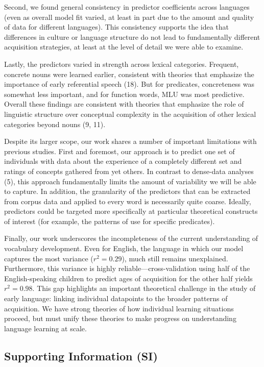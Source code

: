 \documentclass[9pt,twocolumn,twoside]{pnas-new}
\begin{document}
Second, we found general consistency in predictor coefficients across
languages (even as overall model fit varied, at least in part due to the
amount and quality of data for different languages). This consistency
supports the idea that differences in culture or language structure do
not lead to fundamentally different acquisition strategies, at least at
the level of detail we were able to examine.

Lastly, the predictors varied in strength across lexical categories.
Frequent, concrete nouns were learned earlier, consistent with theories
that emphasize the importance of early referential speech (18). But for
predicates, concreteness was somewhat less important, and for function
words, MLU was most predictive. Overall these findings are consistent
with theories that emphasize the role of linguistic structure over
conceptual complexity in the acquisition of other lexical categories
beyond nouns (9, 11).

Despite its larger scope, our work shares a number of important
limitations with previous studies. First and foremost, our approach is
to predict one set of individuals with data about the experience of a
completely different set and ratings of concepts gathered from yet
others. In contrast to dense-data analyses (5), this approach
fundamentally limits the amount of variability we will be able to
capture. In addition, the granularity of the predictors that can be
extracted from corpus data and applied to every word is necessarily
quite coarse. Ideally, predictors could be targeted more specifically at
particular theoretical constructs of interest (for example, the patterns
of use for specific predicates).

Finally, our work underscores the incompleteness of the current
understanding of vocabulary development. Even for English, the language
in which our model captures the most variance (\(r^2 = 0.29\)), much
still remains unexplained. Furthermore, this variance is highly
reliable---cross-validation using half of the English-speaking children
to predict ages of acquisition for the other half yields \(r^2 = 0.98\).
This gap highlights an important theoretical challenge in the study of
early language: linking individual datapoints to the broader patterns of
acquisition. We have strong theories of how individual learning
situations proceed, but must unify these theories to make progress on
understanding language learning at scale.

\subsection*{Supporting Information
(SI)}\label{supporting-information-si}
\end{document}

